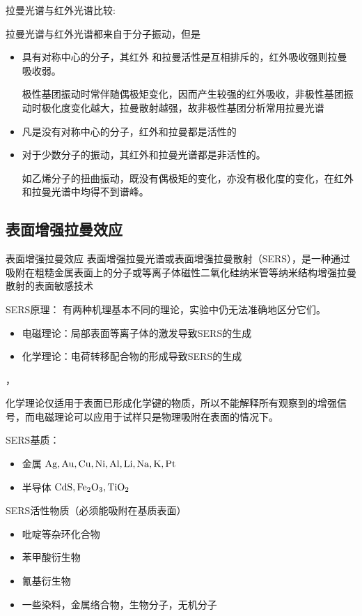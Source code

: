 \begin{note}
	拉曼光谱与红外光谱比较:
	
	拉曼光谱与红外光谱都来自于分子振动，但是
	\begin{itemize}
		\item 具有对称中心的分子，其红外	和拉曼活性是互相排斥的，红外吸收强则拉曼吸收弱。         \begin{example}
			极性基团振动时常伴随偶极矩变化，因而产生较强的红外吸收，非极性基团振动时极化度变化越大，拉曼散射越强，故非极性基团分析常用拉曼光谱
		\end{example}
		\item 凡是没有对称中心的分子，红外和拉曼都是活性的
		\item 对于少数分子的振动，其红外和拉曼光谱都是非活性的。
		\begin{example}
			如乙烯分子的扭曲振动，既没有偶极矩的变化，亦没有极化度的变化，在红外和拉曼光谱中均得不到谱峰。
		\end{example}
	\end{itemize}
\end{note}

\subsection{表面增强拉曼效应}
\begin{definition*}{表面增强拉曼效应}
	表面增强拉曼光谱或表面增强拉曼散射（SERS），是一种通过吸附在粗糙金属表面上的分子或等离子体磁性二氧化硅纳米管等纳米结构增强拉曼散射的表面敏感技术
\end{definition*}

SERS原理：
有两种机理基本不同的理论，实验中仍无法准确地区分它们。
\begin{itemize}
	\item 电磁理论：局部表面等离子体的激发导致SERS的生成
	\item 化学理论：电荷转移配合物的形成导致SERS的生成
\end{itemize}，
\begin{note}
	化学理论仅适用于表面已形成化学键的物质，所以不能解释所有观察到的增强信号，而电磁理论可以应用于试样只是物理吸附在表面的情况下。
\end{note}

SERS基质： 
\begin{itemize}
	\item     金属    $\ce{Ag},\ce{ Au}, \ce{Cu},\ce{Ni},\ce{ Al},\ce{ Li},\ce{ Na,} \ce{K}, \ce{Pt}$
	\item     半导体  $\ce{CdS}, \ce{Fe_{2}O_{3}}, \ce{TiO_{2}}$
\end{itemize}


SERS活性物质（必须能吸附在基质表面）
\begin{itemize}
	\item 	吡啶等杂环化合物
	\item   苯甲酸衍生物
	\item   氰基衍生物
	\item   一些染料，金属络合物，生物分子，无机分子
\end{itemize}